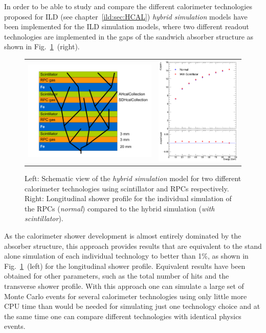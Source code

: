 In order to be able to study and compare the different calorimeter technologies proposed for ILD
(see chapter~\ref{ild:sec:HCAL}) \emph{hybrid simulation} models have been implemented for the
ILD simulation models, where two different readout technologies are implemented in the
gaps of the sandwich absorber structure as shown in Fig.~\ref{fig:hybridsim}~(right). 
%
\begin{figure}[b!]
\begin{tabular}{cc}
\includegraphics[width=0.5\hsize]{Modelling/fig/multi_technology_simulation.pdf}  &
\includegraphics[width=0.5\hsize]{Modelling/fig/SDHcal_hybrid_normal_comparison.png}
\end{tabular}
\caption{\label{fig:hybridsim}Left: Schematic view of the \emph{hybrid simulation} model for two different
  calorimeter technologies using scintillator and RPCs respectively.
  Right: Longitudinal shower profile for the individual simulation of the RPCs (\emph{normal}) compared to
  the hybrid simulation (\emph{with scintillator}).}
\end{figure}
As the calorimeter shower development is almost entirely dominated by the absorber structure, this approach
provides results that are equivalent to the stand alone simulation of each individual technology to better than 1\%,
as shown in Fig.~\ref{fig:hybridsim}~(left) for the longitudinal shower profile. Equivalent results have
been obtained for other parameters, such as the total number of hits and the transverse shower profile.
With this approach one can simulate a large set of Monte Carlo events for
several calorimeter technologies using only little more CPU time than would be needed for simulating just one
technology choice and at the same time one can compare different technologies with identical physics events.


